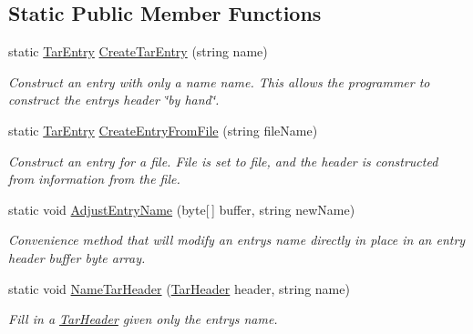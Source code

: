 \subsection*{Static Public Member Functions}
\begin{DoxyCompactItemize}
\item 
static \hyperlink{class_i_c_sharp_code_1_1_sharp_zip_lib_1_1_tar_1_1_tar_entry}{Tar\+Entry} \hyperlink{class_i_c_sharp_code_1_1_sharp_zip_lib_1_1_tar_1_1_tar_entry_a4962c5257d935ff3c2aa355b35eb4302}{Create\+Tar\+Entry} (string name)
\begin{DoxyCompactList}\small\item\em Construct an entry with only a {\itshape name} name. This allows the programmer to construct the entry\textquotesingle{}s header \char`\"{}by hand\char`\"{}. \end{DoxyCompactList}\item 
static \hyperlink{class_i_c_sharp_code_1_1_sharp_zip_lib_1_1_tar_1_1_tar_entry}{Tar\+Entry} \hyperlink{class_i_c_sharp_code_1_1_sharp_zip_lib_1_1_tar_1_1_tar_entry_aad043c4b4c6060f03f8be4ff49784b2a}{Create\+Entry\+From\+File} (string file\+Name)
\begin{DoxyCompactList}\small\item\em Construct an entry for a file. File is set to file, and the header is constructed from information from the file. \end{DoxyCompactList}\item 
static void \hyperlink{class_i_c_sharp_code_1_1_sharp_zip_lib_1_1_tar_1_1_tar_entry_a25e760e814dfc3f326de4c9c397f4908}{Adjust\+Entry\+Name} (byte\mbox{[}$\,$\mbox{]} buffer, string new\+Name)
\begin{DoxyCompactList}\small\item\em Convenience method that will modify an entry\textquotesingle{}s name directly in place in an entry header buffer byte array. \end{DoxyCompactList}\item 
static void \hyperlink{class_i_c_sharp_code_1_1_sharp_zip_lib_1_1_tar_1_1_tar_entry_a99c4bbf521a8d7b62d124f428afe7d97}{Name\+Tar\+Header} (\hyperlink{class_i_c_sharp_code_1_1_sharp_zip_lib_1_1_tar_1_1_tar_header}{Tar\+Header} header, string name)
\begin{DoxyCompactList}\small\item\em Fill in a \hyperlink{class_i_c_sharp_code_1_1_sharp_zip_lib_1_1_tar_1_1_tar_header}{Tar\+Header} given only the entry\textquotesingle{}s name. \end{DoxyCompactList}\end{DoxyCompactItemize}
